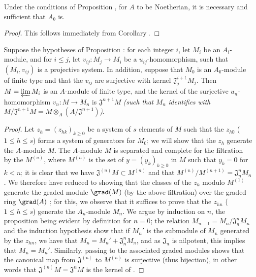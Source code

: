\begin{corollary}[7.2.8]
\label{0.7.2.8}
Under the conditions of Proposition , for $A$ to
be Noetherian, it is necessary and sufficient that $A_0$ is.
\end{corollary}

\begin{proof}
This follows immediately from Corollary .
\end{proof}

\begin{proposition}[7.2.9]
\label{0.7.2.9}
Suppose the hypotheses of Proposition : for each integer $i$,
let $M_i$ be an $A_i$-module, and for $i\leq j$, let $v_{ij}:M_j\to M_i$ be a
$u_{ij}$-homomorphism, such that $(M_i,v_{ij})$ is a projective system. In addition, suppose
that $M_0$ is an $A_0$-module of finite type and that the $v_{ij}$ are surjective with kernel
$\mathfrak{J}_j^{i+1}M_j$. Then $M=\varprojlim M_i$ is an $A$-module of finite type, and the
kernel of the surjective $u_n$-homomorphism $v_n:M\to M_n$ is $\mathfrak{J}^{n+1}M$
\emph{(such that $M_n$ identifies with
$M/\mathfrak{J}^{n+1}M=M\otimes_A(A/\mathfrak{J}^{n+1})$)}.
\end{proposition}

\begin{proof}
Let $z_h=(z_{hk})_{k\geq 0}$ be a system of $s$ elements of $M$ such that the $z_{h0}$
($1\leq h\leq s$) forms a system of generators for $M_0$; we will show that the
$z_h$ generate the $A$-module $M$. The $A$-module $M$ is separated and complete for the
filtration by the $M^{(n)}$, where $M^{(n)}$ is the set of $y=(y_k)_{k\geq 0}$ in $M$
such that $y_k=0$ for $k<n$; it is clear that we have $\mathfrak{J}^{(n)}M\subset M^{(n)}$
and that $M^{(n)}/M^{(n+1)}=\mathfrak{J}_n^n M_n$. We therefore have reduced to showing that
the classes of the $z_h$ modulo $M^{(1)}$ generate the graded module $\grad(M)$ (by the
above filtration) over the graded ring $\grad(A)$ \cite[p.~18--06, lemme]{I-1}; for this, we
observe that it suffices to prove that the $z_{hn}$ ($1\leq h\leq s$) generate the
$A_n$-module $M_n$. We argue by induction on $n$, the proposition being evident by definition
for $n=0$; the relation $M_{n-1}=M_n/\mathfrak{J}_n^n M_n$ and the induction hypothesis show
that if $M_n'$ is the submodule of $M_n$ generated by the $z_{hn}$, we have that
$M_n=M_n'+\mathfrak{J}_n^n M_n$, and as $\mathfrak{J}_n$ is nilpotent, this implies that
$M_n=M_n'$. Similarly, passing to the associated graded modules shows that the canonical map
from $\mathfrak{J}^{(n)}$ to $M^{(n)}$ is surjective (thus bijection), in other words that
$\mathfrak{J}^{(n)}M=\mathfrak{J}^n M$ is the kernel of .
\end{proof}

